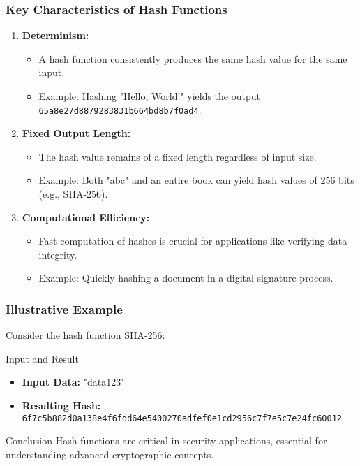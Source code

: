 \documentclass{beamer}
\begin{document}
\begin{frame}[fragile]
    \frametitle{Key Characteristics of Hash Functions}
    \begin{enumerate}
        \item \textbf{Determinism:}
        \begin{itemize}
            \item A hash function consistently produces the same hash value for the same input.
            \item Example: Hashing "Hello, World!" yields the output \\ \texttt{65a8e27d8879283831b664bd8b7f0ad4}.
        \end{itemize}

        \item \textbf{Fixed Output Length:}
        \begin{itemize}
            \item The hash value remains of a fixed length regardless of input size.
            \item Example: Both "abc" and an entire book can yield hash values of 256 bits (e.g., SHA-256).
        \end{itemize}

        \item \textbf{Computational Efficiency:}
        \begin{itemize}
            \item Fast computation of hashes is crucial for applications like verifying data integrity.
            \item Example: Quickly hashing a document in a digital signature process.
        \end{itemize}
    \end{enumerate}
\end{frame}

\begin{frame}[fragile]
    \frametitle{Illustrative Example}
    Consider the hash function SHA-256:
    \begin{block}{Input and Result}
        \begin{itemize}
            \item \textbf{Input Data:} "data123"
            \item \textbf{Resulting Hash:} \texttt{6f7c5b882d0a138e4f6fdd64e5400270adfef0e1cd2956c7f7e5c7e24fc60012}
        \end{itemize}
    \end{block}
    
    \begin{block}{Conclusion}
        Hash functions are critical in security applications, essential for understanding advanced cryptographic concepts.
    \end{block}
\end{frame}
\end{document}
